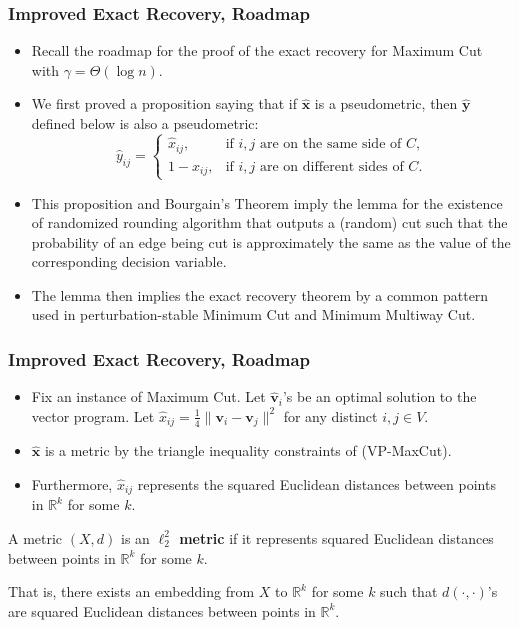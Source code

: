 \documentclass{beamer}
\newcommand{\RR}{\mathbb{R}}
\begin{document}
    \begin{frame}
        \frametitle{Improved Exact Recovery, Roadmap}
    
        \begin{itemize}
            \item Recall the roadmap for the proof of the exact recovery for {\sc Maximum Cut} with $\gamma = \Theta(\log n)$. \pause
            \item We first proved a proposition saying that if $\mathbf{\hat x}$ is a pseudometric, then $\mathbf{\hat y}$ defined below is also a pseudometric:
            $$ \hat y_{ij} = \left\{
                \begin{array}{ll}
                    \hat x_{ij}, & \text{if $i, j$ are on the same side of $C$}, \\
                    1 - \hat x_{ij}, & \text{if $i, j$ are on different sides of $C$}.
                \end{array}
            \right. $$
            \pause
            \item This proposition and Bourgain's Theorem imply the lemma for the existence of randomized rounding algorithm that outputs a (random) cut such that the probability of an edge being cut is approximately the same as the value of the corresponding decision variable. \pause
            \item The lemma then implies the exact recovery theorem by a common pattern used in perturbation-stable {\sc Minimum Cut} and {\sc Minimum Multiway Cut}.
        \end{itemize}
    \end{frame}

    \begin{frame}
        \frametitle{Improved Exact Recovery, Roadmap}
    
        \begin{itemize}
            \item Fix an instance of {\sc Maximum Cut}. Let $\mathbf{\hat v}_i$'s be an optimal solution to the vector program. Let $\hat x_{ij} = \frac{1}{4} \lVert \mathbf v_i - \mathbf v_j \rVert^2$ for any distinct $i, j \in V$. \pause
            \item $\mathbf{\hat x}$ is a metric by the triangle inequality constraints of {\sc (VP-MaxCut)}. \pause
            \item Furthermore, $\hat x_{ij}$ represents the squared Euclidean distances between points in $\RR^k$ for some $k$.
        \end{itemize}

        \pause

        \begin{definition}
            A metric $(X, d)$ is an {\bf $\ell_2^2$ metric} if it represents squared Euclidean distances between points in $\RR^k$ for some $k$.

            That is, there exists an embedding from $X$ to $\RR^k$ for some $k$ such that $d(\cdot, \cdot)$'s are squared Euclidean distances between points in $\RR^k$.
        \end{definition}
    \end{frame}
\end{document}
